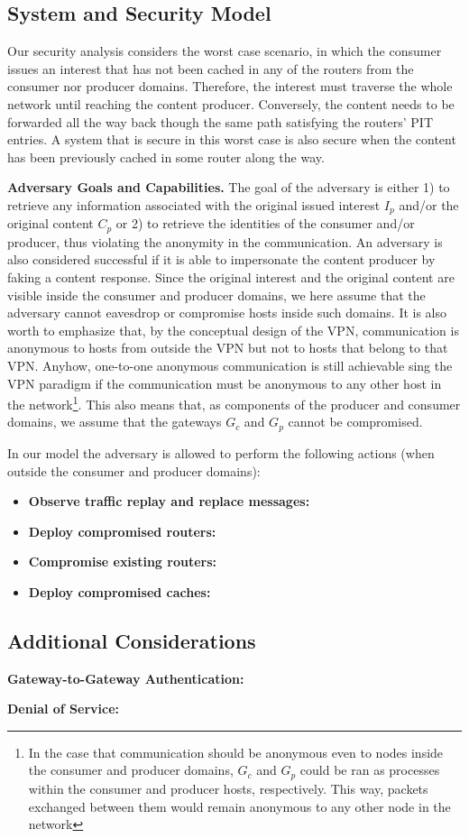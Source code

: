 \subsection{System and Security Model}

Our security analysis considers the worst case scenario, in which the consumer issues an interest that has not been cached in any of the routers from the consumer nor producer domains. Therefore, the interest must traverse the whole network until reaching the content producer. Conversely, the content needs to be forwarded all the way back though the same path satisfying the routers' PIT entries. A system that is secure in this worst case is also secure when the content has been previously cached in some router along the way.

\textbf{Adversary Goals and Capabilities.} The goal of the adversary is either 1) to retrieve any information associated with the original issued interest $I_p$ and/or the original content $C_p$ or 2) to retrieve the identities of the consumer and/or producer, thus violating the anonymity in the communication. An adversary is also considered successful if it is able to impersonate the content producer by faking a content response. Since the original interest and the original content are visible inside the consumer and producer domains, we here assume that the adversary cannot eavesdrop or compromise hosts inside such domains. It is also worth to emphasize that, by the conceptual design of the VPN, communication is anonymous to hosts from outside the VPN but not to hosts that belong to that VPN. Anyhow, one-to-one anonymous communication is still achievable sing the VPN paradigm if the communication must be anonymous to any other host in the network\footnote{In the case that communication should be anonymous even to nodes inside the consumer and producer domains, $G_c$ and $G_p$ could be ran as processes within the consumer and producer hosts, respectively. This way, packets exchanged between them would remain anonymous to any other node in the network}. This also means that, as components of the producer and consumer domains, we assume that the gateways $G_c$ and $G_p$ cannot be compromised.

In our model the adversary is allowed to perform the following actions (when outside the consumer and producer domains):

\begin{itemize}
	\item \textbf{Observe traffic replay and replace messages:}
	\item \textbf{Deploy compromised routers:}
	\item \textbf{Compromise existing routers:}
	\item \textbf{Deploy compromised caches:}
\end{itemize}

\subsection{Additional Considerations}

\textbf{Gateway-to-Gateway Authentication:}

\textbf{Denial of Service:}
